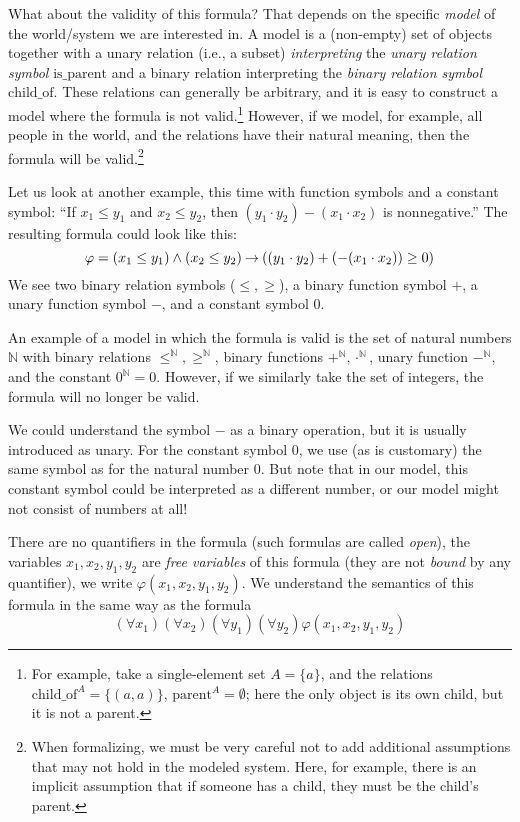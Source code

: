 What about the validity of this formula? That depends on the specific \emph{model} of the world/system we are interested in. A model is a (non-empty) set of objects together with a unary relation (i.e., a subset) \emph{interpreting} the \emph{unary relation symbol} $\mathrm{is\_parent}$ and a binary relation interpreting the \emph{binary relation symbol} $\mathrm{child\_of}$. These relations can generally be arbitrary, and it is easy to construct a model where the formula is not valid.\footnote{For example, take a single-element set $A=\{a\}$, and the relations $\mathrm{child\_of}^A=\{(a,a)\}$, $\mathrm{parent}^A=\emptyset$; here the only object is its own child, but it is not a parent.} However, if we model, for example, all people in the world, and the relations have their natural meaning, then the formula will be valid.\footnote{When formalizing, we must be very careful not to add additional assumptions that may not hold in the modeled system. Here, for example, there is an implicit assumption that if someone has a child, they must be the child's parent.}

Let us look at another example, this time with function symbols and a constant symbol: ``If $x_1\leq y_1$ and $x_2\leq y_2$, then $(y_1 \cdot y_2)-(x_1\cdot x_2)$ is nonnegative.'' The resulting formula could look like this:
$$
\varphi=(x_1\leq y_1)\land (x_2\leq y_2)\mathbin{\rightarrow} ((y_1 \cdot y_2)+(-(x_1\cdot x_2))\geq 0)
$$
We see two binary relation symbols ($\leq,\geq$), a binary function symbol $+$, a unary function symbol $-$, and a constant symbol $0$.

An example of a model in which the formula is valid is the set of natural numbers $\mathbb N$ with binary relations $\leq^\mathbb N,\geq^\mathbb N$, binary functions $+^\mathbb N,\cdot^\mathbb N$, unary function $-^\mathbb N$, and the constant $0^\mathbb N=0$. However, if we similarly take the set of integers, the formula will no longer be valid.

\begin{remark}
We could understand the symbol $-$ as a binary operation, but it is usually introduced as unary. For the constant symbol $0$, we use (as is customary) the same symbol as for the natural number 0. But note that in our model, this constant symbol could be interpreted as a different number, or our model might not consist of numbers at all!
\end{remark}

There are no quantifiers in the formula (such formulas are called \emph{open}), the variables $x_1,x_2,y_1,y_2$ are \emph{free variables} of this formula (they are not \emph{bound} by any quantifier), we write $\varphi(x_1,x_2,y_1,y_2)$. We understand the semantics of this formula in the same way as the formula
$$
(\forall x_1)(\forall x_2)(\forall y_1)(\forall y_2)\varphi(x_1,x_2,y_1,y_2)
$$

